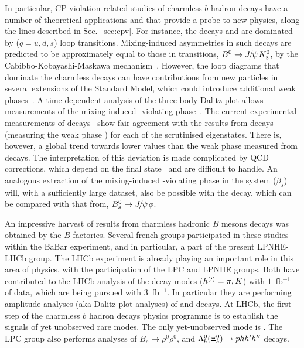 In particular, CP-violation related studies of charmless $b$-hadron decays have a number of theoretical applications and that provide a probe to new physics, along the lines described in Sec.~\ref{sec:cpv}.
For instance, the decays \BdtoKsPiPi and \BdtoKsKK are dominated by \btoqqbars ($q = u,d,s$)
loop transitions.
Mixing-induced \CP asymmetries in such decays are predicted to be approximately
equal to those in \btoccbars transitions, \eg ${{B}^0}\rightarrow{\ensuremath{{J\mskip -3mu/\mskip -2mu\psi\mskip 2mu}}}{\ensuremath{{K}^0_{\rm\scriptscriptstyle S}}}$, by the
Cabibbo-Kobayashi-Maskawa mechanism~\cite{Cabibbo:1963yz,Kobayashi:1973fv}.
However, the loop diagrams that dominate the charmless decays can have
contributions from new particles in several extensions of the Standard Model,
which could introduce additional weak phases~\cite{Buchalla:2005us,Grossman:1996ke,London:1997zk,Ciuchini:1997zp}.
A time-dependent analysis of the three-body Dalitz plot allows measurements of
the mixing-induced \CP-violating
phase~\cite{Dalseno:2008wwa,Aubert:2009me,Nakahama:2010nj,Lees:2012kxa}. 
 The current experimental measurements of \btoqqbars decays~\cite{HFAG} show
fair agreement with the results from \btoccbars decays (measuring the weak
phase \Pbeta) for each of the scrutinised \CP eigenstates.
There is, however, a global trend towards lower values than the weak phase
measured from \btoccbars decays.
The interpretation of this deviation is made complicated by QCD
corrections, which depend on the final state~\cite{Silvestrini:2007yf} and
are difficult to handle.
An analogous extraction of the mixing-induced \CP-violating phase in the
\Bs system ($\beta_s$) will, with a sufficiently large dataset, also be possible with
the \BstoKsKPi decay, which can be compared with that from, \eg
${{B}^0_{s}}\rightarrow{\ensuremath{{J\mskip -3mu/\mskip -2mu\psi\mskip 2mu}}}\phi$.

An impressive harvest of results from charmless hadronic $B$ mesons decays was obtained by the $B$ factories. Several french groups participated in these studies within the BaBar experiment, and in particular, a part of the present LPNHE-LHCb group. The LHCb experiment is already playing an important role in this area of physics, with the participation of the LPC and LPNHE groups. Both have contributed to the LHCb analysis of the decay modes \BstoKshhp ($h^{(\prime)} = \pi, K$) with $1$~fb$^{-1}$ of data, which are being pursued with $3$~fb$^{-1}$.  In particular they are performing amplitude analyses (aka Dalitz-plot analyses) of \BdtoKsPiPi and \BdtoKsKK decays. At LHCb, the first step of the charmless $b$ hadron decays physics programme is to establish the signals of yet unobserved rare modes. The only yet-unobserved \BstoKshhp mode is \BstoKsKK. The LPC group also performs analyses of $B_s \to \rho^0 \rho^0$, and $\Lambda_b^0 (\Xi_b^0) \rightarrow p h h^{\prime}h^{\prime\prime}$ decays.

